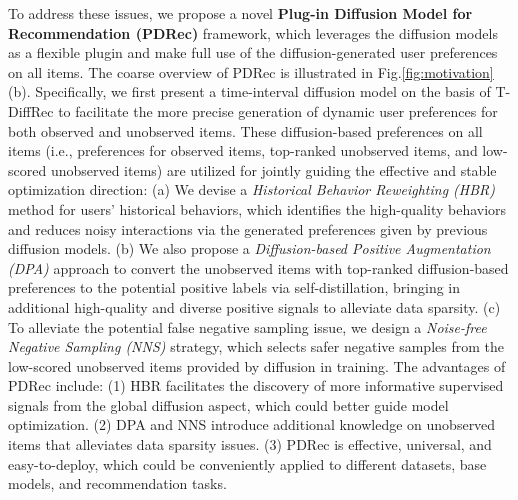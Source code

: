 \documentclass[letterpaper]{article} %
\begin{document}
To address these issues, we propose a novel \textbf{Plug-in Diffusion Model for Recommendation (PDRec)} framework, which leverages the diffusion models as a flexible plugin and make full use of the diffusion-generated user preferences on all items. The coarse overview of PDRec is illustrated in Fig.\ref{fig:motivation} (b). Specifically, we first present a time-interval diffusion model on the basis of T-DiffRec to facilitate the more precise generation of dynamic user preferences for both observed and unobserved items. 
These diffusion-based preferences on all items (i.e., preferences for observed items, top-ranked unobserved items, and low-scored unobserved items) are utilized for jointly guiding the effective and stable optimization direction: 
(a) We devise a \emph{Historical Behavior Reweighting (HBR)} method for users' historical behaviors, which identifies the high-quality behaviors and reduces noisy interactions via the generated preferences given by previous diffusion models.
(b) We also propose a \emph{Diffusion-based Positive Augmentation (DPA)} approach to convert the unobserved items with top-ranked diffusion-based preferences to the potential positive labels via self-distillation, bringing in additional high-quality and diverse positive signals to alleviate data sparsity. 
(c) To alleviate the potential false negative sampling issue, we design a \emph{Noise-free Negative Sampling (NNS)} strategy, which selects safer negative samples from the low-scored unobserved items provided by diffusion in training.
The advantages of PDRec include: (1) HBR facilitates the discovery of more informative supervised signals from the global diffusion aspect, which could better guide model optimization. (2) DPA and NNS introduce additional knowledge on unobserved items that alleviates data sparsity issues. (3) PDRec is effective, universal, and easy-to-deploy, which could be conveniently applied to different datasets, base models, and recommendation tasks.
\end{document}
